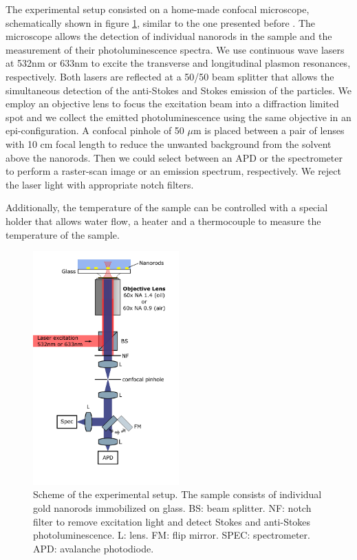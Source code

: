 \documentclass[journal=nalefd,manuscript=letter]{achemso}
\begin{document}
The experimental setup consisted on a home-made confocal microscope, schematically shown in figure
\ref{fig:setup}, similar to the one presented before \cite{Carattino2016a}. The microscope allows 
the detection of individual nanorods in the sample and the measurement of their photoluminescence spectra. 
We use continuous wave lasers at 532nm or 633nm to excite  the transverse and longitudinal plasmon resonances, respectively. Both lasers are reflected at a 50/50 beam splitter that allows the simultaneous detection of the anti-Stokes and Stokes emission of the particles.
We employ an objective lens to focus the excitation beam into a diffraction 
limited spot and we collect the emitted photoluminescence using the same objective in an epi-configuration. 
A confocal pinhole of 50 $\mu$m is placed between a pair of lenses with 10 cm focal length to reduce the unwanted background from the solvent above the nanorods. Then we could select between an APD or the spectrometer to perform a raster-scan image or an emission spectrum, respectively. We reject the laser light with appropriate notch filters.

Additionally, the temperature of the sample can be controlled with a special holder that allows 
water flow, a heater and a thermocouple to measure the temperature of the sample. 

\begin{figure}[htp] \centering
\includegraphics[width=0.5\textwidth]{Figures/Supplementary/02_Setup/setup.png}
\caption{Scheme of the experimental setup. The sample consists of individual gold nanorods immobilized on glass. BS: beam splitter. NF: notch filter to remove excitation light and detect Stokes and anti-Stokes photoluminescence. L: lens. FM: flip mirror. SPEC: spectrometer. APD: avalanche photodiode.}
	\label{fig:setup}
\end{figure}
\end{document}
